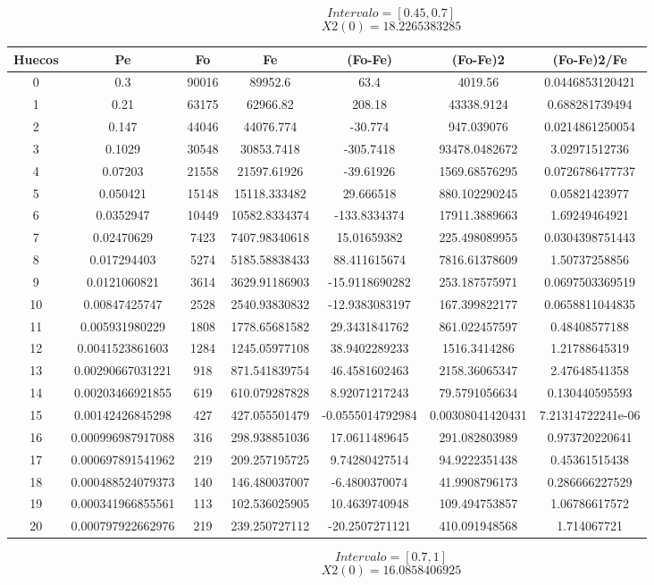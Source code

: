 \documentclass{article}
\begin{document}
$$
Intervalo = [0.45, 0.7]
$$
$$
X2(0) = 18.2265383285
$$
\begin{tabular}{|c|c|c|c|c|c|c|}
Huecos&Pe&Fo&Fe&(Fo{-}Fe)&(Fo{-}Fe)2&(Fo{-}Fe)2/Fe\\
\hline
0&0.3&90016&89952.6&63.4&4019.56&0.0446853120421\\
\hline
1&0.21&63175&62966.82&208.18&43338.9124&0.688281739494\\
\hline
2&0.147&44046&44076.774&{-}30.774&947.039076&0.0214861250054\\
\hline
3&0.1029&30548&30853.7418&{-}305.7418&93478.0482672&3.02971512736\\
\hline
4&0.07203&21558&21597.61926&{-}39.61926&1569.68576295&0.0726786477737\\
\hline
5&0.050421&15148&15118.333482&29.666518&880.102290245&0.05821423977\\
\hline
6&0.0352947&10449&10582.8334374&{-}133.8334374&17911.3889663&1.69249464921\\
\hline
7&0.02470629&7423&7407.98340618&15.01659382&225.498089955&0.0304398751443\\
\hline
8&0.017294403&5274&5185.58838433&88.411615674&7816.61378609&1.50737258856\\
\hline
9&0.0121060821&3614&3629.91186903&{-}15.9118690282&253.187575971&0.0697503369519\\
\hline
10&0.00847425747&2528&2540.93830832&{-}12.9383083197&167.399822177&0.0658811044835\\
\hline
11&0.005931980229&1808&1778.65681582&29.3431841762&861.022457597&0.48408577188\\
\hline
12&0.0041523861603&1284&1245.05977108&38.9402289233&1516.3414286&1.21788645319\\
\hline
13&0.00290667031221&918&871.541839754&46.4581602463&2158.36065347&2.47648541358\\
\hline
14&0.00203466921855&619&610.079287828&8.92071217243&79.5791056634&0.130440595593\\
\hline
15&0.00142426845298&427&427.055501479&{-}0.0555014792984&0.00308041420431&7.21314722241e{-}06\\
\hline
16&0.000996987917088&316&298.938851036&17.0611489645&291.082803989&0.973720220641\\
\hline
17&0.000697891541962&219&209.257195725&9.74280427514&94.9222351438&0.45361515438\\
\hline
18&0.000488524079373&140&146.480037007&{-}6.4800370074&41.9908796173&0.286666227529\\
\hline
19&0.000341966855561&113&102.536025905&10.4639740948&109.494753857&1.06786617572\\
\hline
20&0.000797922662976&219&239.250727112&{-}20.2507271121&410.091948568&1.714067721\\
\end{tabular}
$$
Intervalo = [0.7, 1]
$$
$$
X2(0) = 16.0858406925
$$
\end{document}
